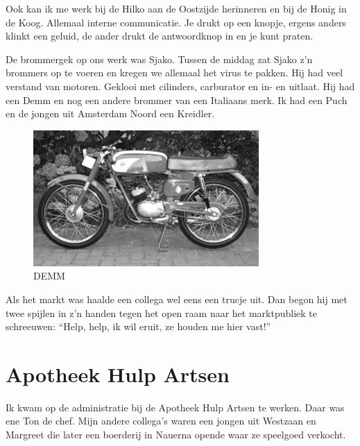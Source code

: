 \documentclass[12pt,twoside, openright]{memoir}
\begin{document}
Ook kan ik me werk bij de Hilko aan de Oostzijde herinneren en bij de Honig in de Koog. Allemaal interne communicatie. Je drukt op een knopje, ergens anders klinkt een geluid, de ander drukt de antwoordknop in en je kunt praten.	


De brommergek op ons werk was Sjako. Tussen de middag zat Sjako z'n brommers op te voeren en kregen we allemaal het virus te pakken. Hij had veel verstand van motoren. Geklooi met cilinders, carburator en in- en uitlaat. Hij had een Demm en nog een andere brommer van een Italiaans merk. Ik had een Puch en de jongen uit Amsterdam Noord een Kreidler. 

\begin{figure}
\centering
\includegraphics[width=\textwidth]{img/205DEMM}
\caption*{\footnotesize DEMM}
\end{figure}

Als het markt was haalde een collega wel eens een trucje uit.  Dan begon hij met twee spijlen in z'n handen tegen het open raam naar het marktpubliek te schreeuwen: ``Help, help, ik wil eruit, ze houden me hier vast!''

\section*{Apotheek Hulp Artsen} %
\label{cha:apotheek}

Ik kwam op de administratie bij de Apotheek Hulp Artsen te werken. Daar was ene Ton de chef. Mijn andere collega's waren een jongen uit Westzaan en Margreet die later een boerderij in Nauerna opende waar ze speelgoed verkocht. 
\end{document}
